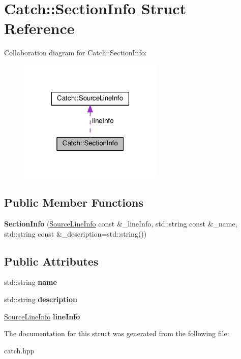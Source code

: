 \hypertarget{structCatch_1_1SectionInfo}{}\section{Catch\+:\+:Section\+Info Struct Reference}
\label{structCatch_1_1SectionInfo}


Collaboration diagram for Catch\+:\+:Section\+Info\+:\nopagebreak
\begin{figure}[H]
\begin{center}
\leavevmode
\includegraphics[width=194pt]{structCatch_1_1SectionInfo__coll__graph}
\end{center}
\end{figure}
\subsection*{Public Member Functions}
\begin{DoxyCompactItemize}
\item 
{\bfseries Section\+Info} (\hyperlink{structCatch_1_1SourceLineInfo}{Source\+Line\+Info} const \&\+\_\+line\+Info, std\+::string const \&\+\_\+name, std\+::string const \&\+\_\+description=std\+::string())\hypertarget{structCatch_1_1SectionInfo_a27aff3aaf8b6611f3651b17111a272c6}{}\label{structCatch_1_1SectionInfo_a27aff3aaf8b6611f3651b17111a272c6}

\end{DoxyCompactItemize}
\subsection*{Public Attributes}
\begin{DoxyCompactItemize}
\item 
std\+::string {\bfseries name}\hypertarget{structCatch_1_1SectionInfo_a704c8fc662d309137e0d4f199cb7df58}{}\label{structCatch_1_1SectionInfo_a704c8fc662d309137e0d4f199cb7df58}

\item 
std\+::string {\bfseries description}\hypertarget{structCatch_1_1SectionInfo_a0052060219a6de74bb7ade34d4163a4e}{}\label{structCatch_1_1SectionInfo_a0052060219a6de74bb7ade34d4163a4e}

\item 
\hyperlink{structCatch_1_1SourceLineInfo}{Source\+Line\+Info} {\bfseries line\+Info}\hypertarget{structCatch_1_1SectionInfo_adbc83b8a3507c4acc8ee249e93465711}{}\label{structCatch_1_1SectionInfo_adbc83b8a3507c4acc8ee249e93465711}

\end{DoxyCompactItemize}


The documentation for this struct was generated from the following file\+:\begin{DoxyCompactItemize}
\item 
catch.\+hpp\end{DoxyCompactItemize}
